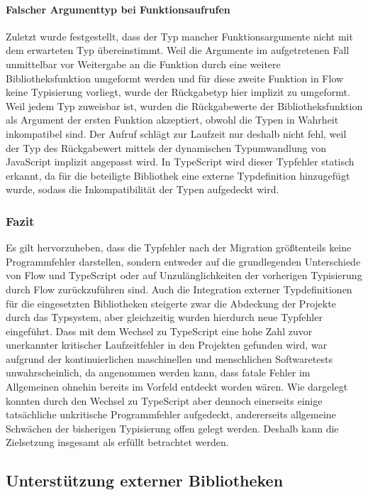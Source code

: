 \vspace{-0.5\baselineskip}
\paragraph{Falscher Argumenttyp bei Funktionsaufrufen}
Zuletzt wurde festgestellt, dass der Typ mancher Funktionsargumente nicht mit dem erwarteten Typ übereinstimmt. Weil die Argumente im aufgetretenen Fall unmittelbar vor Weitergabe an die Funktion durch eine weitere Bibliotheksfunktion umgeformt werden und für diese zweite Funktion in Flow keine Typisierung vorliegt, wurde der Rückgabetyp hier implizit zu  umgeformt. Weil  jedem Typ zuweisbar ist, wurden die Rückgabewerte der Bibliotheksfunktion als Argument der ersten Funktion akzeptiert, obwohl die Typen in Wahrheit inkompatibel sind. Der Aufruf schlägt zur Laufzeit nur deshalb nicht fehl, weil der Typ des Rückgabewert mittels der dynamischen Typumwandlung von JavaScript implizit angepasst wird. In TypeScript wird dieser Typfehler statisch erkannt, da für die beteiligte Bibliothek eine externe Typdefinition hinzugefügt wurde, sodass die Inkompatibilität der Typen aufgedeckt wird.

\subsubsection{Fazit}

Es gilt hervorzuheben, dass die Typfehler nach der Migration größtenteils keine Programmfehler darstellen, sondern entweder auf die grundlegenden Unterschiede von Flow und TypeScript oder auf Unzulänglichkeiten der vorherigen Typisierung durch Flow zurückzuführen sind. Auch die Integration externer Typdefinitionen für die eingesetzten Bibliotheken steigerte zwar die Abdeckung der Projekte durch das Typsystem, aber gleichzeitig wurden hierdurch neue Typfehler eingeführt. Dass mit dem Wechsel zu TypeScript eine hohe Zahl zuvor unerkannter kritischer Laufzeitfehler in den Projekten gefunden wird, war aufgrund der kontinuierlichen maschinellen und menschlichen Softwaretests unwahrscheinlich, da angenommen werden kann, dass fatale Fehler im Allgemeinen ohnehin bereits im Vorfeld entdeckt worden wären. Wie dargelegt konnten durch den Wechsel zu TypeScript aber dennoch einerseits einige tatsächliche unkritische Programmfehler aufgedeckt, andererseits allgemeine Schwächen der bisherigen Typisierung offen gelegt werden. Deshalb kann die Zielsetzung insgesamt als erfüllt betrachtet werden.

\subsection{Unterstützung externer Bibliotheken}

